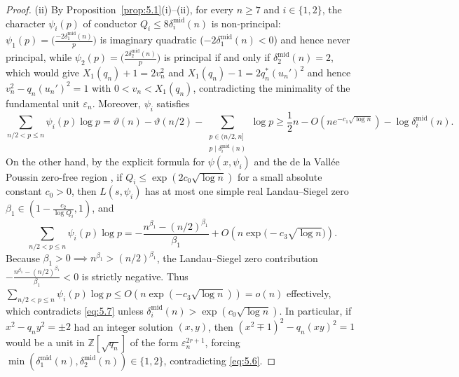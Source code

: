 \documentclass[11pt,reqno]{amsart}
\theoremstyle{remark}
\numberwithin{equation}{section}
\newcommand{\Z}{\mathbb{Z}}
\begin{document}
\begin{proof}
(ii) By Proposition~\ref{prop:5.1}(i)--(ii), for every $n \ge 7$ and $i \in \{1, 2\}$, the character $\psi_i(p)$ of conductor $Q_i \le 8\delta_i^{\mathrm{mid}}(n)$ is non-principal: $\psi_1(p) = \bigl(\frac{-2\delta_1^{\mathrm{mid}}(n)}{p}\bigr)$ is imaginary quadratic ($-2\delta_1^{\mathrm{mid}}(n) < 0$) and hence never principal, while $\psi_2(p) = \bigl(\frac{2\delta_2^{\mathrm{mid}}(n)}{p}\bigr)$ is principal if and only if $\delta_2^{\mathrm{mid}}(n) = 2$, which would give $X_1(q_n) + 1 = 2v_n^2$ and $X_1(q_n) - 1 = 2q_n^*(u_n')^2$ and hence $v_n^2 - q_n(u_n')^2 = 1$ with $0 < v_n < X_1(q_n)$, contradicting the minimality of the fundamental unit $\varepsilon_n$. Moreover, $\psi_i$ satisfies
\begin{equation}\label{eq:5.7}
\sum_{n/2 < p \le n} \psi_i(p)\log p = \vartheta(n) - \vartheta(n/2) - \sum_{\substack{p \in (n/2, n] \\ p \mid \delta_i^{\mathrm{mid}}(n)}} \log p \ge \frac{1}{2}n - O\!\left(ne^{-c_1\sqrt{\log n}}\right) - \log \delta_i^{\mathrm{mid}}(n).
\end{equation}
On the other hand, by the explicit formula for $\psi(x, \psi_i)$ and the de la Vall\'ee Poussin zero-free region \cite[Chapter~19]{Davenport2000}, if $Q_i \le \exp(2c_0\sqrt{\log n})$ for a small absolute constant $c_0 > 0$, then $L(s, \psi_i)$ has at most one simple real Landau--Siegel zero $\beta_1 \in (1 - \frac{c_2}{\log Q_i}, 1)$, and
\[
\sum_{n/2 < p \le n} \psi_i(p)\log p = -\frac{n^{\beta_1} - (n/2)^{\beta_1}}{\beta_1} + O\!\left(n\exp\bigl(-c_3\sqrt{\log n}\bigr)\right).
\]
Because $\beta_1 > 0 \implies n^{\beta_1} > (n/2)^{\beta_1}$, the Landau--Siegel zero contribution $-\frac{n^{\beta_1} - (n/2)^{\beta_1}}{\beta_1} < 0$ is strictly negative. Thus $\sum_{n/2 < p \le n} \psi_i(p)\log p \le O(n\exp(-c_3\sqrt{\log n})) = o(n)$ effectively, which contradicts \eqref{eq:5.7} unless $\delta_i^{\mathrm{mid}}(n) > \exp(c_0\sqrt{\log n})$. In particular, if $x^2 - q_n y^2 = \pm 2$ had an integer solution $(x, y)$, then $(x^2 \mp 1)^2 - q_n(xy)^2 = 1$ would be a unit in $\Z[\sqrt{q_n}]$ of the form $\varepsilon_n^{2r+1}$, forcing $\min(\delta_1^{\mathrm{mid}}(n), \delta_2^{\mathrm{mid}}(n)) \in \{1, 2\}$, contradicting \eqref{eq:5.6}.
\end{proof}
\end{document}
